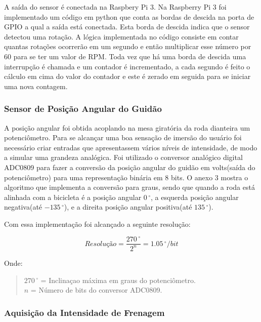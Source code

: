     	A saída do sensor é conectada na Raspbery Pi 3. Na Raspberry  Pi 3 foi implementado um código em python que conta as bordas de descida na porta de GPIO a qual a saída está conectada. Esta borda de descida indica que o sensor detectou uma rotação. A lógica implementada no código consiste em contar quantas rotações ocorrerão em um segundo e então multiplicar esse número por 60 para se ter um valor de RPM. Toda vez que há uma borda de descida uma interrupção é chamada e um contador é incrementado, a cada segundo é feito o cálculo em cima do valor do contador e este é zerado em seguida para se iniciar uma nova contagem.
 
 \subsubsection{Sensor de Posição Angular do Guidão}        

A posição angular foi obtida acoplando na mesa giratória da roda dianteira um potenciômetro. Para se alcançar uma boa sensação de imersão do usuário foi necessário  criar entradas  que apresentassem  vários níveis de intensidade, de modo a simular uma grandeza analógica. Foi utilizado o conversor  analógico digital ADC0809 para fazer a conversão da posição angular do guidão em volts(saída do potenciômetro) para uma representação binária em 8 bits. O anexo 3 mostra o algoritmo que implementa a conversão para graus, sendo que quando a roda está alinhada com a bicicleta é a posição angular $0\,^{\circ}$, a esquerda posição angular negativa(até $-135\,^{\circ}$), e a direita posição angular positiva(até $135\,^{\circ}$).

Com essa implementação foi alcançado a seguinte resolução:

\begin{equation}
Resolução =  \frac{270\,^{\circ}}{2^n} = 1.05\,^{\circ}/bit
\label{apon}
\end{equation}

Onde: 
\begin{quote}
$270\,^{\circ}$ = Inclinaçao máxima em graus do potenciômetro.\\
$n$ =  Número de bits do conversor ADC0809.\\
\end{quote}



\subsubsection{Aquisição da Intensidade de Frenagem} 

